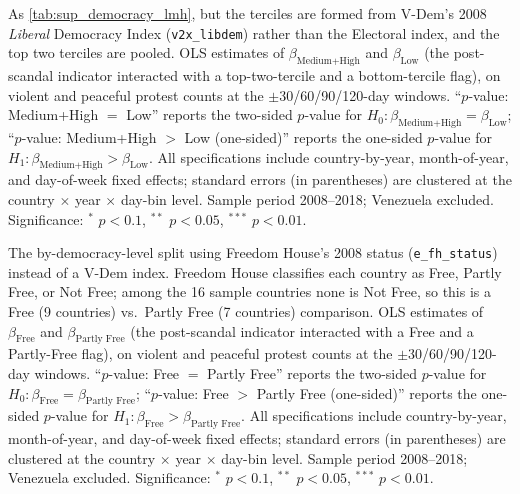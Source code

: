 \documentclass[11pt]{article}
\let\mathbetasym\beta
\renewcommand{\beta}{\ensuremath{\mathbetasym}}
\begin{document}
\begin{table}[htb!]
    \caption{Effect by 2008 level of democracy (Liberal index): Low vs.\ Medium+High.}
    \label{tab:sup_democracy_terciles_libdem_lmh}
    \begin{center}
        \scriptsize{}
    \end{center}
    \footnotesize{As \autoref{tab:sup_democracy_lmh}, but the terciles are formed from V-Dem's 2008 \emph{Liberal} Democracy Index (\texttt{v2x\_libdem}) rather than the Electoral index, and the top two terciles are pooled. OLS estimates of $\beta_{\text{Medium+High}}$ and $\beta_{\text{Low}}$ (the post-scandal indicator interacted with a top-two-tercile and a bottom-tercile flag), on violent and peaceful protest counts at the $\pm$30/60/90/120-day windows. ``$p$-value: Medium+High $=$ Low'' reports the two-sided $p$-value for $H_0:\beta_{\text{Medium+High}}=\beta_{\text{Low}}$; ``$p$-value: Medium+High $>$ Low (one-sided)'' reports the one-sided $p$-value for $H_1:\beta_{\text{Medium+High}}>\beta_{\text{Low}}$. All specifications include country-by-year, month-of-year, and day-of-week fixed effects; standard errors (in parentheses) are clustered at the country $\times$ year $\times$ day-bin level. Sample period 2008--2018; Venezuela excluded. Significance: $^{*}$ $p<0.1$, $^{**}$ $p<0.05$, $^{***}$ $p<0.01$.}
\end{table}

\begin{table}[htb!]
    \caption{Effect by 2008 level of democracy: Freedom House status.}
    \label{tab:sup_democracy_fh}
    \begin{center}
        \scriptsize{}
    \end{center}
    \footnotesize{The by-democracy-level split using Freedom House's 2008 status (\texttt{e\_fh\_status}) instead of a V-Dem index. Freedom House classifies each country as Free, Partly Free, or Not Free; among the 16 sample countries none is Not Free, so this is a Free (9 countries) vs.\ Partly Free (7 countries) comparison. OLS estimates of $\beta_{\text{Free}}$ and $\beta_{\text{Partly Free}}$ (the post-scandal indicator interacted with a Free and a Partly-Free flag), on violent and peaceful protest counts at the $\pm$30/60/90/120-day windows. ``$p$-value: Free $=$ Partly Free'' reports the two-sided $p$-value for $H_0:\beta_{\text{Free}}=\beta_{\text{Partly Free}}$; ``$p$-value: Free $>$ Partly Free (one-sided)'' reports the one-sided $p$-value for $H_1:\beta_{\text{Free}}>\beta_{\text{Partly Free}}$. All specifications include country-by-year, month-of-year, and day-of-week fixed effects; standard errors (in parentheses) are clustered at the country $\times$ year $\times$ day-bin level. Sample period 2008--2018; Venezuela excluded. Significance: $^{*}$ $p<0.1$, $^{**}$ $p<0.05$, $^{***}$ $p<0.01$.}
\end{table}
\end{document}
